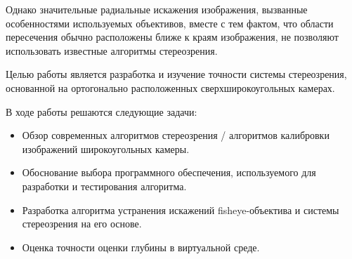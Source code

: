 Однако значительные радиальные искажения изображения, вызванные особенностями используемых объективов, вместе с тем фактом, что области пересечения 
обычно расположены ближе к краям изображения, не позволяют использовать известные алгоритмы стереозрения.                                       %

Целью работы является разработка и изучение точности системы стереозрения, основанной на ортогонально расположенных сверхширокоугольных камерах.

В ходе работы решаются следующие задачи:
\begin{itemize}
    \item Обзор современных алгоритмов стереозрения / алгоритмов калибровки изображений широкоугольных камеры.
    \item Обоснование выбора программного обеспечения, используемого для разработки и тестирования алгоритма. 
    \item Разработка алгоритма устранения искажений fisheye-объектива и системы стереозрения на его основе.                                     %
    \item Оценка точности оценки глубины в виртуальной среде.  
\end{itemize}
